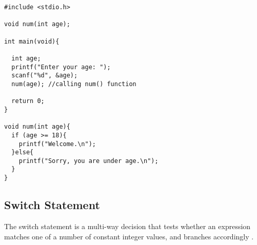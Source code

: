 \documentclass[10pt, a4paper, twocolumn]{article} %
\begin{document}
\begin{lstlisting}
#include <stdio.h>

void num(int age);

int main(void){

  int age;
  printf("Enter your age: ");
  scanf("%d", &age);
  num(age); //calling num() function

  return 0;
}

void num(int age){
  if (age >= 18){
    printf("Welcome.\n");
  }else{
    printf("Sorry, you are under age.\n");
  }
}
\end{lstlisting}

\subsection{Switch Statement}


The switch statement is a multi-way decision that tests whether an expression matches one of a number of constant integer values, and branches accordingly .
\end{document}
